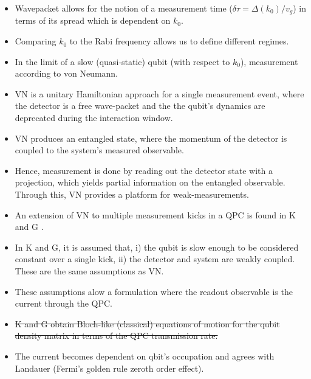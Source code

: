 \documentclass[10pt,
 amsmath,amssymb,
 aps,prb, twocolumn
]{revtex4-2}
\begin{document}
\begin{itemize}
    \item Wavepacket allows for the notion of a measurement time ($\delta \tau = \Delta(k_0)/v_g$) in terms of its spread which is dependent on $k_0$. 
    
    \item Comparing $k_0$ to the Rabi frequency allows us to define different regimes.
    
    \item In the limit of a slow (quasi-static) qubit (with respect to $k_0$), measurement according to von Neumann. 

    \item VN is a unitary Hamiltonian approach for a single measurement event, where the detector is a free wave-packet and the the qubit's dynamics are deprecated during the interaction window.
    
    \item VN produces an entangled state, where the momentum of the detector is coupled to the system's measured observable.

    \item Hence, measurement is done by reading out the detector state with a projection, which yields partial information on the entangled observable. Through this, VN provides a platform for weak-measurements. 
    
    \item An extension of VN to multiple measurement kicks in a QPC is found in K \cite{korotkov1999} and G \cite{gurvitz1997}.
    
    \item In K and G, it is assumed that, i) the qubit is slow enough to be considered constant over a single kick, ii)  the detector and system are weakly coupled. These are the same assumptions as VN.

    \item These assumptions alow a formulation where the readout observable is the current through the QPC.

    \item \st{K and G obtain Bloch-like (classical) equations of motion for the qubit density matrix in terms of the QPC transmission rate.}
    
    \item The current becomes dependent on qbit's occupation and agrees with Landauer (Fermi's golden rule zeroth order effect).  


\end{itemize}
\end{document}
